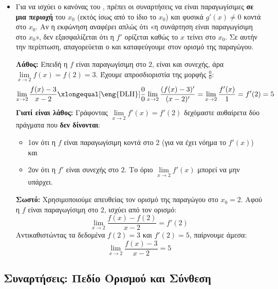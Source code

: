 \begin{itemize}[label=\textcolor{red!80!black}{\faExclamationTriangle},itemindent=7mm,leftmargin=0mm]
\item {}

Για να ισχύει ο κανόνας του , πρέπει οι συναρτήσεις να είναι παραγωγίσιμες \textbf{σε μια περιοχή} του $x_0$ (εκτός ίσως από το ίδιο το $x_0$) και φυσικά $g'(x) \neq 0$ κοντά στο $x_0$. 
Αν η εκφώνηση αναφέρει απλώς ότι «η συνάρτηση είναι παραγωγίσιμη στο $x_0$», δεν εξασφαλίζεται ότι η $f'$ ορίζεται καθώς το $x$ τείνει στο $x_0$. Σε αυτήν την περίπτωση, απαγορεύεται ο  και καταφεύγουμε στον ορισμό της παραγώγου.


\lysh
\textbf{Λάθος:} 
Επειδή η $f$ είναι παραγωγίσιμη στο $2$, είναι και συνεχής, άρα $\lim\limits_{x\to 2}f(x) = f(2) = 3$. Έχουμε απροσδιοριστία της μορφής $\frac{0}{0}$:
\[ \lim_{x\to 2}\frac{f(x) - 3}{x - 2} \xlongequal[\text{\eng{DLH}}]{\frac{0}{0}} \lim_{x\to 2}\frac{(f(x) - 3)'}{(x - 2)'} = \lim_{x\to 2}\frac{f'(x)}{1} = f'(2) = 5 \]
\textbf{Γιατί είναι λάθος:} Γράφοντας $\lim\limits_{x\to 2}f'(x) = f'(2)$ δεχόμαστε αυθαίρετα δύο πράγματα που \textbf{δεν δίνονται}: 
\begin{itemize}
\item 1ον ότι η $f$ είναι παραγωγίσιμη κοντά στο $2$ (για να έχει νόημα το $f'(x)$) και 
\item 2ον ότι η $f'$ είναι συνεχής στο $2$. Το όριο $\lim\limits_{x\to 2}f'(x)$ μπορεί να μην υπάρχει.
\end{itemize}


\textbf{Σωστό:}
Χρησιμοποιούμε απευθείας τον ορισμό της παραγώγου στο $x_0 = 2$.
Αφού η $f$ είναι παραγωγίσιμη στο $2$, ισχύει από τον ορισμό:
\[ \lim_{x\to 2}\frac{f(x) - f(2)}{x - 2} = f'(2) \]
Αντικαθιστώντας τα δεδομένα $f(2) = 3$ και $f'(2) = 5$, παίρνουμε άμεσα:
\[ \lim_{x\to 2}\frac{f(x) - 3}{x - 2} = 5 \]
\end{itemize}

\subsection{Συναρτήσεις: Πεδίο Ορισμού και Σύνθεση}

